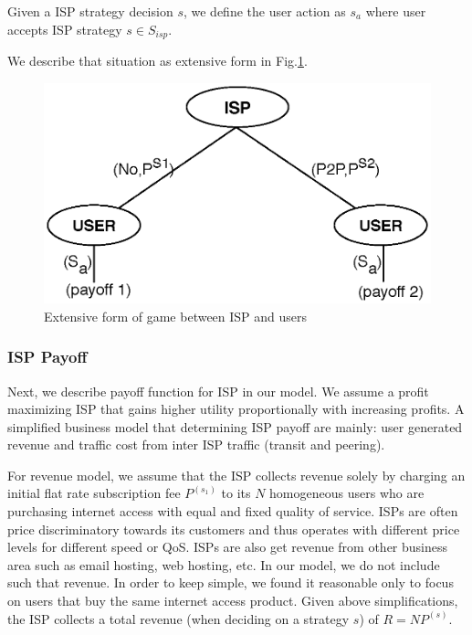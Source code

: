 \documentclass[paper]{ieice}
\begin{document}
\newtheorem{theorem2}{Definition}
\begin{theorem}
Given a ISP strategy decision $s$, we define the user action as $s_a$ where user accepts ISP strategy $s \in S_{isp}$.
\end{theorem}
We describe that situation as extensive form in Fig.\ref{fig:gametree}.



\begin{figure}[tb] 
\begin{center}
\includegraphics[scale=0.35]{graphs/game-tree.eps}
\end{center}
\caption{Extensive form of game between ISP and users}
\label{fig:gametree}
\vspace{-2mm}
\end{figure}

\subsubsection{ISP Payoff}
Next, we describe payoff function for ISP in our model.  
We assume a profit maximizing ISP that gains higher utility proportionally with increasing profits. 
A simplified business model that determining ISP payoff are mainly: user generated revenue and traffic cost from inter ISP traffic (transit and peering).

For revenue model, we assume that the ISP collects revenue solely by charging an initial flat rate subscription fee $P^{(s_1)}$ to its $N$ homogeneous users who are purchasing internet access with equal and fixed quality of service.
ISPs are often price discriminatory towards its customers and thus operates with different price levels for different speed or QoS.
ISPs are also get revenue from other business area such as email hosting, web hosting, etc. 
In our model, we do not include such that revenue. 
In order to keep simple, we found it reasonable only to focus on users that buy the same internet access product. 
Given above simplifications, the ISP collects a total revenue (when deciding on a strategy $s$) of $R = N P^{(s)}$.
\end{document}
